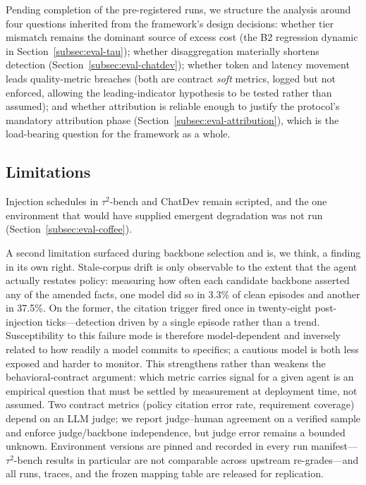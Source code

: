 Pending completion of the pre-registered runs, we structure the analysis
around four questions inherited from the framework's design decisions:
whether tier mismatch remains the dominant source of excess cost (the B2
regression dynamic in Section~\ref{subsec:eval-tau}); whether disaggregation
materially shortens detection (Section~\ref{subsec:eval-chatdev}); whether
token and latency movement leads quality-metric breaches (both are contract
\emph{soft} metrics, logged but not enforced, allowing the leading-indicator
hypothesis to be tested rather than assumed); and whether attribution is
reliable enough to justify the protocol's mandatory attribution phase
(Section~\ref{subsec:eval-attribution}), which is the load-bearing question
for the framework as a whole.

\subsection{Limitations}
\label{subsec:eval-limitations}

Injection schedules in $\tau^2$-bench and ChatDev remain scripted, and the
one environment that would have supplied emergent degradation was not run
(Section~\ref{subsec:eval-coffee}).

A second limitation surfaced during backbone selection and is, we think,
a finding in its own right. Stale-corpus drift is only observable to the extent
that the agent actually restates policy: measuring how often each candidate
backbone asserted any of the amended facts, one model did so in 3.3\% of clean
episodes and another in 37.5\%. On the former, the citation trigger fired once
in twenty-eight post-injection ticks---detection driven by a single episode
rather than a trend. Susceptibility to this failure mode is therefore
model-dependent and inversely related to how readily a model commits to
specifics; a cautious model is both less exposed and harder to monitor. This
strengthens rather than weakens the behavioral-contract argument: which metric
carries signal for a given agent is an empirical question that must be settled
by measurement at deployment time, not assumed. Two contract metrics (policy citation error rate,
requirement coverage) depend on an LLM judge; we report judge--human agreement
on a verified sample and enforce judge/backbone independence, but judge error
remains a bounded unknown. Environment versions are pinned and recorded in
every run manifest---$\tau^2$-bench results in particular are not comparable
across upstream re-grades---and all runs, traces, and the frozen mapping table
are released for replication.
